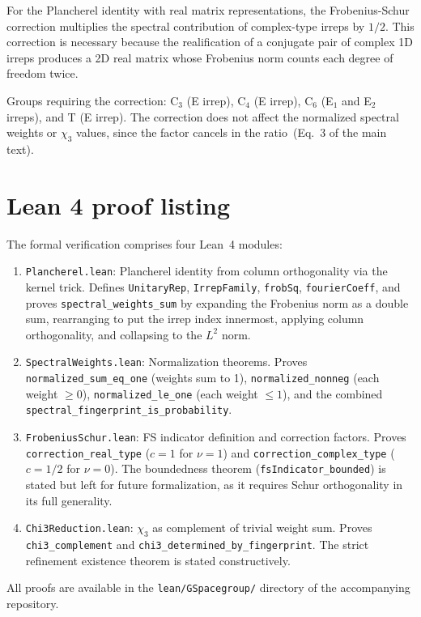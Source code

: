 \documentclass[aps,prb,onecolumn]{revtex4-2}
\begin{document}
For the Plancherel identity with real matrix representations, the
Frobenius-Schur correction multiplies the spectral contribution of
complex-type irreps by $1/2$. This correction is necessary because
the realification of a conjugate pair of complex 1D irreps produces
a 2D real matrix whose Frobenius norm counts each degree of freedom
twice.

Groups requiring the correction: C$_3$ (E irrep), C$_4$ (E irrep),
C$_6$ (E$_1$ and E$_2$ irreps), and T (E irrep). The correction does
not affect the normalized spectral weights or $\chi_3$ values, since
the factor cancels in the ratio~(Eq.~3 of the main text).

\section{Lean 4 proof listing}
\label{sec:lean-proofs}

The formal verification comprises four Lean~4 modules:

\begin{enumerate}
  \item \texttt{Plancherel.lean}: Plancherel identity from column
    orthogonality via the kernel trick. Defines \texttt{UnitaryRep},
    \texttt{IrrepFamily}, \texttt{frobSq}, \texttt{fourierCoeff},
    and proves \texttt{spectral\_weights\_sum} by expanding the
    Frobenius norm as a double sum, rearranging to put the irrep
    index innermost, applying column orthogonality, and collapsing
    to the $L^2$ norm.

  \item \texttt{SpectralWeights.lean}: Normalization theorems.
    Proves \texttt{normalized\_sum\_eq\_one} (weights sum to 1),
    \texttt{normalized\_nonneg} (each weight $\ge 0$),
    \texttt{normalized\_le\_one} (each weight $\le 1$), and
    the combined \texttt{spectral\_fingerprint\_is\_probability}.

  \item \texttt{FrobeniusSchur.lean}: FS indicator definition and
    correction factors. Proves \texttt{correction\_real\_type}
    ($c = 1$ for $\nu = 1$) and \texttt{correction\_complex\_type}
    ($c = 1/2$ for $\nu = 0$). The boundedness theorem
    (\texttt{fsIndicator\_bounded}) is stated but left for
    future formalization, as it requires Schur orthogonality
    in its full generality.

  \item \texttt{Chi3Reduction.lean}: $\chi_3$ as complement of
    trivial weight sum. Proves \texttt{chi3\_complement} and
    \texttt{chi3\_determined\_by\_fingerprint}. The strict
    refinement existence theorem is stated constructively.
\end{enumerate}

All proofs are available in the \texttt{lean/GSpacegroup/} directory
of the accompanying repository.
\end{document}
